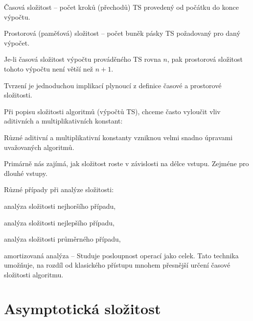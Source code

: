 \begin{compactitem}
    \item Časová složitost -- počet kroků (přechodů) TS provedený od počátku do konce výpočtu.

    \item Prostorová (paměťová) složitost -- počet buněk pásky TS požadovaný pro daný výpočet.

    \item Je-li časová složitost výpočtu prováděného TS rovna $n$, pak prostorová složitost tohoto výpočtu není větší než $n + 1$. \begin{compactitem}
        \item Tvrzení je jednoduchou implikací plynoucí z definice časové a prostorové složitosti.
    \end{compactitem}

    \item Při popisu složitosti algoritmů (výpočtů TS), chceme často vyloučit vliv aditivních a multiplikativních konstant: \begin{compactitem}
        \item Různé aditivní a multiplikativní konstanty vzniknou velmi snadno  úpravami uvažovaných algoritmů.
        \item Primárně nás zajímá, jak složitost roste v závislosti na délce vstupu. Zejméne pro dlouhé vstupy.
    \end{compactitem}

    \item Různé případy při analýze složitosti: \begin{compactitem}
        \item analýza složitosti nejhoršího případu,
        \item analýza složitosti nejlepšího případu,
        \item analýza složitosti průměrného případu,
        \item amortizovaná analýza -- Studuje posloupnost operací jako celek. Tato technika umožňuje, na rozdíl od klasického přístupu mnohem přesnější určení časové složitosti algoritmu.
    \end{compactitem}

\end{compactitem}


\section{Asymptotická složitost}

